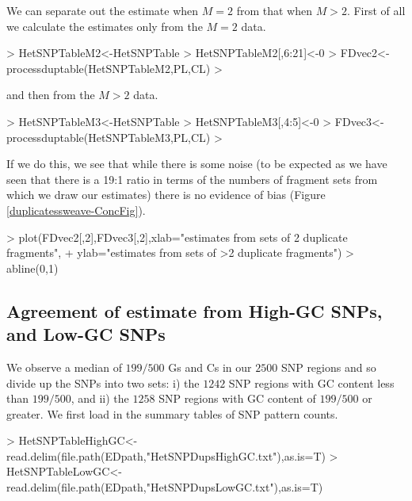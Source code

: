 \documentclass{article}
\begin{document}
We can separate out the estimate when $M=2$ from that when $M>2$. First of all we calculate the estimates only from the $M=2$ data.

\begin{Schunk}
\begin{Sinput}
> HetSNPTableM2<-HetSNPTable
> HetSNPTableM2[,6:21]<-0
> FDvec2<-processduptable(HetSNPTableM2,PL,CL)
> 
\end{Sinput}
\end{Schunk}

and then from the $M>2$ data.

\begin{Schunk}
\begin{Sinput}
> HetSNPTableM3<-HetSNPTable
> HetSNPTableM3[,4:5]<-0
> FDvec3<-processduptable(HetSNPTableM3,PL,CL)
> 
\end{Sinput}
\end{Schunk}


If we do this, we see that while there is some noise (to be expected as we have seen that there is a 19:1 ratio in terms of the numbers of fragment sets from which we draw our estimates) there is no evidence of bias (Figure \ref{duplicatessweave-ConcFig}).

\begin{Schunk}
\begin{Sinput}
> plot(FDvec2[,2],FDvec3[,2],xlab="estimates from sets of 2 duplicate fragments",
+      ylab="estimates from sets of >2 duplicate fragments")
> abline(0,1)
\end{Sinput}
\end{Schunk}



\subsection{Agreement of estimate from High-GC SNPs, and Low-GC SNPs}

We observe a median of $199 / 500$ Gs and Cs in our $2500$ SNP regions and so divide up the SNPs into two sets: i) the $1242$ SNP regions with GC content less than $199 / 500$, and ii) the $1258$ SNP regions with GC content of $199 / 500$ or greater. We first load in the summary tables of SNP pattern counts.

\begin{Schunk}
\begin{Sinput}
> HetSNPTableHighGC<-read.delim(file.path(EDpath,"HetSNPDupsHighGC.txt"),as.is=T)
> HetSNPTableLowGC<-read.delim(file.path(EDpath,"HetSNPDupsLowGC.txt"),as.is=T)
\end{Sinput}
\end{Schunk}
\end{document}
